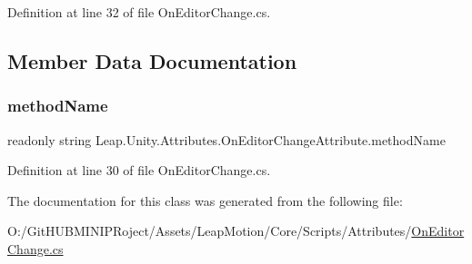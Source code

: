 Definition at line 32 of file On\+Editor\+Change.\+cs.



\subsection{Member Data Documentation}
\mbox{\label{class_leap_1_1_unity_1_1_attributes_1_1_on_editor_change_attribute_ad63cb7d1bcdca28af84e4d1754145686}} 
\subsubsection{\texorpdfstring{methodName}{methodName}}
{\footnotesize\ttfamily readonly string Leap.\+Unity.\+Attributes.\+On\+Editor\+Change\+Attribute.\+method\+Name}



Definition at line 30 of file On\+Editor\+Change.\+cs.



The documentation for this class was generated from the following file\+:\begin{DoxyCompactItemize}
\item 
O\+:/\+Git\+H\+U\+B\+M\+I\+N\+I\+P\+Roject/\+Assets/\+Leap\+Motion/\+Core/\+Scripts/\+Attributes/\mbox{\hyperlink{_on_editor_change_8cs}{On\+Editor\+Change.\+cs}}\end{DoxyCompactItemize}
